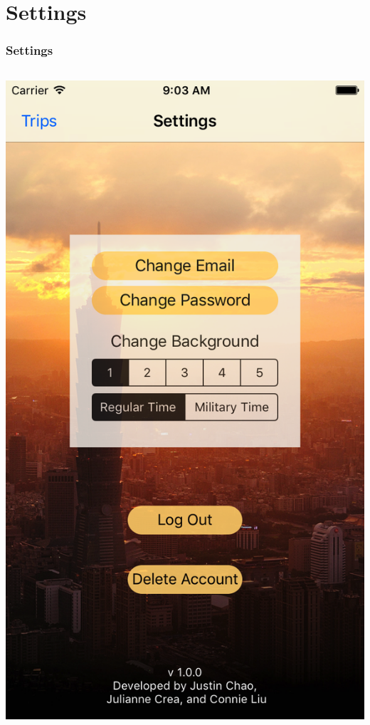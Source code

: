 \documentclass{beamer}
\begin{document}
\section{Settings}
\begin{frame}
\frametitle{Settings}
\begin{columns}
    \begin{column}{0.3\textwidth}
        \begin{center}
            \includegraphics[scale=0.14]{settings1}

\end{center}
\end{column}
\end{columns}
\end{frame}
\end{document}
